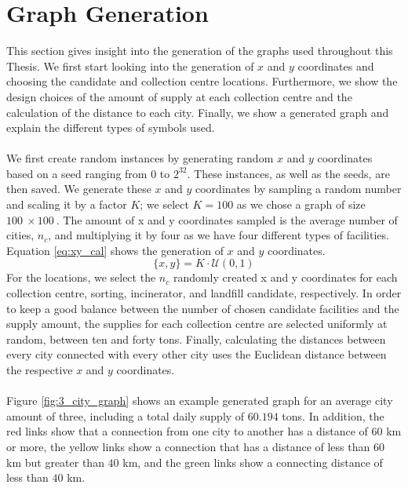 \documentclass[mscthesis, 11pt]{usiinfthesis}
\theoremstyle{newdefinition}
\begin{document}
\section{Graph Generation}\label{sec:graph_generation}
This section gives insight into the generation of the graphs used throughout this Thesis. We first start looking into the generation of $x$ and $y$ coordinates and choosing the candidate and collection centre locations. Furthermore, we show the design choices of the amount of supply at each collection centre and the calculation of the distance to each city. Finally, we show a generated graph and explain the different types of symbols used. 
\\\\
We first create random instances by generating random $x$ and $y$ coordinates based on a seed ranging from $0$ to $2^{32}$. These instances, as well as the seeds, are then saved. We generate these $x$ and $y$ coordinates by sampling a random number and scaling it by a factor $K$; we select $K = 100$ as we chose a graph of size $100 \: \times 100 \:$. The amount of x and y coordinates sampled is the average number of cities, $n_c$, and multiplying it by four as we have four different types of facilities. Equation \ref{eq:xy_cal} shows the generation of $x$ and $y$ coordinates.
\begin{equation}\label{eq:xy_cal}
    \{x, y\} = K \cdot \mathcal{U}(0,1)
\end{equation}
For the locations, we select the $n_c$ randomly created x and y coordinates for each collection centre, sorting, incinerator, and landfill candidate, respectively. In order to keep a good balance between the number of chosen candidate facilities and the supply amount, the supplies for each collection centre are selected uniformly at random, between ten and forty tons. 
Finally, calculating the distances between every city connected with every other city uses the Euclidean distance between the respective $x$ and $y$ coordinates.
\\\\
Figure \ref{fig:3_city_graph} shows an example generated graph for an average city amount of three, including a total daily supply of $60.194$ tons. In addition, the red links show that a connection from one city to another has a distance of $60$ km or more, the yellow links show a connection that has a distance of less than $60$ km but greater than $40$ km, and the green links show a connecting distance of less than $40$ km. 
\\\\
\end{document}
